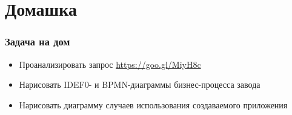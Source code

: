 \documentclass[xetex,mathserif,serif]{beamer}
\begin{document}
	\section{Домашка}

	\begin{frame}
		\frametitle{Задача на дом}
		\begin{itemize}
			\item Проанализировать запрос \url{https://goo.gl/MiyH8c}
			\item Нарисовать IDEF0- и BPMN-диаграммы бизнес-процесса завода
			\item Нарисовать диаграмму случаев использования создаваемого приложения
		\end{itemize}
	\end{frame}
\end{document}
